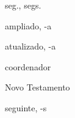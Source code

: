 %
\begin{listadeabreviaturas}{seg., segs.}
\item[ampl.] ampliado, -a
\item[atual.] atualizado, -a
\item[coord.] coordenador
\item[N.~T.] Novo Testamento
\item[seg., segs.] seguinte, -s
\end{listadeabreviaturas}